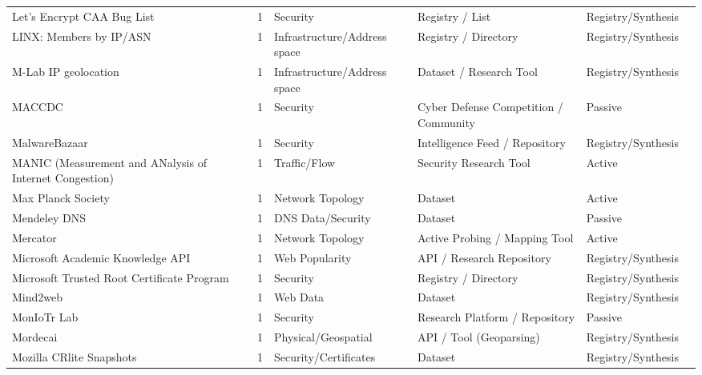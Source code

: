 \documentclass[11pt,a4paper]{article}
\begin{document}
\begin{longtable}{@{}p{}p{}p{}p{}p{}p{}p{}@{}}
Let's Encrypt CAA Bug List & \cite{lets_encrypt_caa_bug} & 1 & Security & Registry / List & Registry/Synthesis & \cite{10.1007/978-3-030-72582-2_10} \\
LINX: Members by IP/ASN & \cite{linx_members} & 1 & Infrastructure/Address space & Registry / Directory & Registry/Synthesis & \cite{10.1007/978-3-030-98785-5_16} \\
M-Lab IP geolocation & \cite{mlab_geolocation} & 1 & Infrastructure/Address space & Dataset / Research Tool & Registry/Synthesis & \cite{10.1145/3646547.3688441} \\
MACCDC & \cite{maccdc} & 1 & Security & Cyber Defense Competition / Community & Passive & \cite{10.1145/3487552.3487856} \\
MalwareBazaar & \cite{malwarebazaar} & 1 & Security & Intelligence Feed / Repository & Registry/Synthesis & \cite{10.1145/3517745.3561463} \\
MANIC (Measurement and ANalysis of Internet Congestion) & \cite{manic} & 1 & Traffic/Flow & Security Research Tool & Active & \cite{10.1007/978-3-030-98785-5_7} \\
Max Planck Society & \cite{edmond} & 1 & Network Topology & Dataset & Active & \cite{10.1007/978-3-032-18268-5_5} \\
Mendeley DNS & \cite{mendeley} & 1 & DNS Data/Security & Dataset & Passive & \cite{10.1145/3777912.3839801} \\
Mercator & \cite{832534} & 1 & Network Topology & Active Probing / Mapping Tool & Active & \cite{10.1145/3487552.3487812} \\
Microsoft Academic Knowledge API & \cite{academicknowledge} & 1 & Web Popularity & API / Research Repository & Registry/Synthesis & \cite{10.1145/3487552.3487821} \\
Microsoft Trusted Root Certificate Program & \cite{microsoftroot} & 1 & Security & Registry / Directory & Registry/Synthesis & \cite{10.1145/3646547.3688415} \\
Mind2web & \cite{mind2web} & 1 & Web Data & Dataset & Registry/Synthesis & \cite{10.1145/3777912.3839788} \\
MonIoTr Lab & \cite{moniotr} & 1 & Security & Research Platform / Repository & Passive & \cite{10.1145/3618257.3624830} \\
Mordecai & \cite{mordecai} & 1 & Physical/Geospatial & API / Tool (Geoparsing) & Registry/Synthesis & \cite{10.1145/3618257.3624816} \\
Mozilla CRlite Snapshots & \cite{crlite} & 1 & Security/Certificates & Dataset & Registry/Synthesis & \cite{10.1145/3777912.3839820} \\

\end{longtable}
\end{document}
